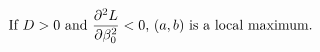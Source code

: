 \documentclass[preview]{standalone}
\begin{document}
\begin{align*}
\special{dvisvgm:raw <g id='unique000'>}\text{If }D>0\text{ and }\frac{\partial^2 L}{\partial \beta_0^2}<0\text{, }(a,b)\text{ is a local maximum}.\special{dvisvgm:raw </g>}
\end{align*}
\end{document}
